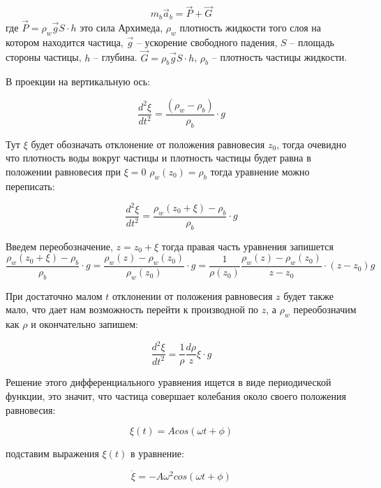 \begin{equation}
    m_b \vec{a}_b = \vec{P} + \vec{G}
\end{equation}
где $\vec{P}=\rho_w \vec{g} S \cdot h$ это сила Архимеда, $\rho_w$ плотность жидкости того слоя на котором находится частица, $\vec{g}$ -- ускорение свободного падения, $S$ -- площадь стороны частицы, $h$  -- глубина. $\vec{G} = \rho_b \vec{g} S \cdot h$,  $\rho_b$ -- плотность частицы жидкости.

В проекции на вертикальную ось:

\begin{equation}
    \frac{d^2 \xi}{dt^2} = \frac{(\rho_w-\rho_b)}{\rho_b}\cdot g
\end{equation}

Тут $\xi$ будет обозначать отклонение от положения равновесия $z_0$, тогда очевидно что плотность воды вокруг частицы и плотность частицы будет равна в положении равновесия при $\xi=0$ $\rho_w(z_0)=\rho_b$ тогда уравнение можно переписать:

\begin{equation}
    \frac{d^2 \xi}{dt^2} = \frac{\rho_w(z_0+\xi)-\rho_b}{\rho_b}\cdot g
    \label{eq:beg}
\end{equation}

Введем переобозначение, $z=z_0+\xi$ тогда правая часть уравнения запишется $$\frac{\rho_w(z_0+\xi)-\rho_b}{\rho_b}\cdot g = \frac{\rho_w(z)-\rho_w(z_0)}{\rho_w(z_0)}\cdot g = \frac{1}{\rho(z_0)} \frac{\rho_w(z)-\rho_w(z_0)}{z-z_0}\cdot(z-z_0) g$$

При достаточно малом $t$ отклонении от положения равновесия $z$ будет также мало, что дает нам возможность перейти к производной по $z$, а $\rho_w$ переобозначим как $\rho$ и окончательно запишем:

\begin{equation}
    \frac{d^2 \xi}{dt^2} =\frac{1}{\rho} \frac{d\rho}{z}\xi \cdot g
\end{equation}

Решение этого дифференциального уравнения ищется в виде периодической функции, это значит, что частица совершает колебания около своего положения равновесия:

\begin{equation}
    \xi(t)=A cos(\omega t + \phi)
\end{equation}

подставим выражения $\xi(t)$ в уравнение:

\begin{equation}
    \ddot{\xi} = - A \omega^2 cos(\omega t + \phi )
\end{equation}

